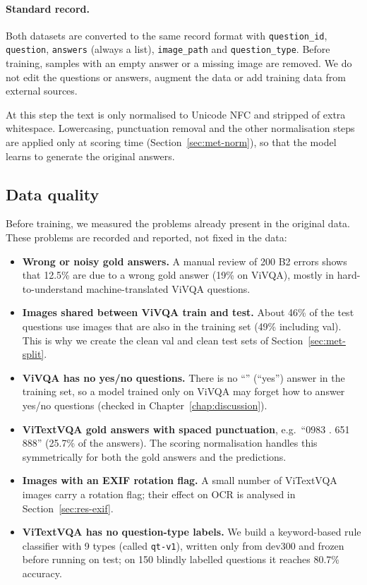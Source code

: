 \paragraph{Standard record.} Both datasets are converted to the same record format with
\texttt{question\_id}, \texttt{question}, \texttt{answers} (always a list),
\texttt{image\_path} and \texttt{question\_type}. Before training, samples with an empty
answer or a missing image are removed. We do not edit the questions or answers,
augment the data or add training data from external sources.

At this step the text is only normalised to Unicode NFC and stripped of extra
whitespace. Lowercasing, punctuation removal and the other normalisation steps are
applied only at scoring time (Section~\ref{sec:met-norm}), so that the model learns to
generate the original answers.

\subsection{Data quality}
\label{sec:met-quality}

Before training, we measured the problems already present in the original data.
These problems are recorded and reported, not fixed in the data:

\begin{itemize}
  \item \textbf{Wrong or noisy gold answers.} A manual review of 200 B2 errors shows that
  12.5\% are due to a wrong gold answer (19\% on ViVQA), mostly in hard-to-understand
  machine-translated ViVQA questions.
  \item \textbf{Images shared between ViVQA train and test.} About 46\% of the test
  questions use images that are also in the training set (49\% including val). This is
  why we create the clean val and clean test sets of
  Section~\ref{sec:met-split}.
  \item \textbf{ViVQA has no yes/no questions.} There is no ``'' (``yes'') answer in
  the training set, so a model trained only on ViVQA may forget how to answer yes/no
  questions (checked in Chapter~\ref{chap:discussion}).
  \item \textbf{ViTextVQA gold answers with spaced punctuation}, e.g.\ ``0983 . 651 888''
  (25.7\% of the answers). The scoring normalisation handles this symmetrically for both
  the gold answers and the predictions.
  \item \textbf{Images with an EXIF rotation flag.} A small number of ViTextVQA images
  carry a rotation flag; their effect on OCR is analysed in Section~\ref{sec:res-exif}.
  \item \textbf{ViTextVQA has no question-type labels.} We build a keyword-based
  rule classifier with 9 types (called \texttt{qt-v1}), written only from dev300 and
  frozen before running on test; on 150 blindly labelled questions it reaches 80.7\%
  accuracy.
\end{itemize}

